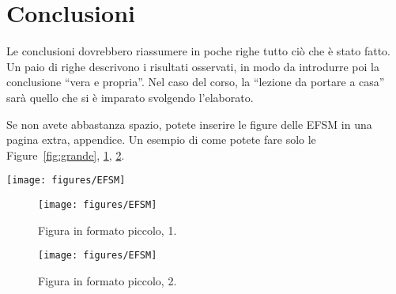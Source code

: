 \documentclass[]{IEEEtran}
\begin{document}
\section{Conclusioni}
Le conclusioni dovrebbero riassumere in poche righe  tutto ci\`o che \`e stato fatto. Un paio di righe descrivono i risultati osservati, in modo da introdurre poi la conclusione ``vera e propria''. Nel caso del corso, la ``lezione da portare a casa'' sar\`a quello che si \`e imparato svolgendo l'elaborato.





\appendix
Se non avete abbastanza spazio, potete inserire le figure delle EFSM in una  pagina extra, appendice. Un esempio di come potete fare solo le Figure~\ref{fig:grande}, \ref{fig:piccola1}, \ref{fig:piccola2}.


\begin{figure*}[bt]
\centering
\texttt{[image: figures/EFSM]}
\caption{Figura in formato grande.}
\label{fig:grande}
\end{figure*}

\begin{figure}[bt]
	\centering
	\texttt{[image: figures/EFSM]}
	\caption{Figura in formato piccolo, 1.}
	\label{fig:piccola1}
\end{figure}

\begin{figure}[bt]
	\centering
	\texttt{[image: figures/EFSM]}
	\caption{Figura in formato piccolo, 2.}
	\label{fig:piccola2}
\end{figure}
\end{document}
